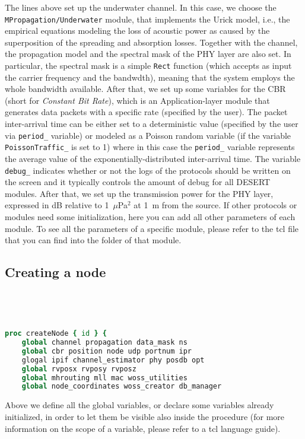 \documentclass[11pt]{article}
\begin{document}
The lines above set up the underwater channel. In this case, we choose the {\tt MPropagation/Underwater} module, that implements the Urick model, i.e., the empirical equations modeling the loss of acoustic power as caused by the superposition of the spreading and absorption losses. Together with the channel, the propagation model and the spectral mask of the PHY layer are also set. In particular, the spectral mask is a simple  {\tt Rect} function (which accepts as input the carrier frequency and the bandwdth), meaning that the system employs the whole bandwidth available.
After that, we set up some variables for the CBR (short for {\it Constant Bit Rate}), which is an Application-layer module that generates data packets with a specific rate (specified by the user). The packet inter-arrival time can be either set to a deterministic value (specified by the user via {\tt period\_} variable) or modeled as a Poisson random variable (if the variable {\tt PoissonTraffic\_} is set to 1) where in this case the {\tt period\_} variable represents the average value of the exponentially-distributed inter-arrival time.
The variable {\tt debug\_} indicates whether or not the logs of the protocols should be written on the screen and it typically controls the amount of debug for all DESERT modules.
After that, we set up the transmission power for the PHY layer, expressed in dB relative to 1~$\mu$Pa$^2$ at 1~m from the source. 
If other protocols or modules need some initialization, here you can add all other parameters of each module. To see all the parameters of a specific module, please refer to the tcl file that you can find into the folder of that module.

\subsection{Creating a node}
\ 
{\scriptsize\tt
\begin{lstlisting}[language=tcl]
proc createNode { id } {
    global channel propagation data_mask ns 
    global cbr position node udp portnum ipr 
    glogal ipif channel_estimator phy posdb opt
    global rvposx rvposy rvposz 
    global mhrouting mll mac woss_utilities 
    global node_coordinates woss_creator db_manager
\end{lstlisting}  
}

Above we define all the global variables, or declare some variables already initialized, in order to let them be
visible also inside the procedure (for more information on the scope of a variable, please refer to a tcl language guide).\\
\end{document}
